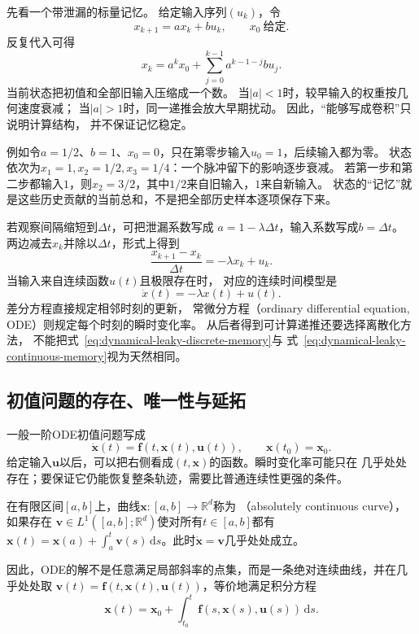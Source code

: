 先看一个带泄漏的标量记忆。 给定输入序列$(u_{k})$，令
\begin{equation}
	x_{k+1}=a x_{k}+b u_{k}, \qquad x_{0}\ \text{给定}. \label{eq:dynamical-leaky-discrete-memory}
\end{equation}
反复代入可得
\begin{equation}
	x_{k}= a^{k}x_{0}+ \sum_{j=0}^{k-1}a^{k-1-j}b u_{j}. \label{eq:dynamical-discrete-variation-constants}
\end{equation}
当前状态把初值和全部旧输入压缩成一个数。 当$|a|<1$时，较早输入的权重按几何速度衰减；
当$|a|>1$时，同一递推会放大早期扰动。 因此，“能够写成卷积”只说明计算结构，
并不保证记忆稳定。

例如令$a=1/2$、$b=1$、$x_0=0$，只在第零步输入$u_0=1$，后续输入都为零。
状态依次为$x_1=1,x_2=1/2,x_3=1/4$：一个脉冲留下的影响逐步衰减。
若第一步和第二步都输入$1$，则$x_2=3/2$，其中$1/2$来自旧输入，$1$来自新输入。
状态的“记忆”就是这些历史贡献的当前总和，不是把全部历史样本逐项保存下来。


若观察间隔缩短到$\Delta t$，可把泄漏系数写成 $a=1-\lambda\Delta t$，输入系数写成$b
=\Delta t$。 两边减去$x_{k}$并除以$\Delta t$，形式上得到
\[
	\frac{x_{k+1}-x_{k}}{\Delta t}= -\lambda x_{k}+u_{k}.
\]
当输入来自连续函数$u(t)$且极限存在时， 对应的连续时间模型是
\begin{equation}
	\dot{x}(t)=-\lambda x(t)+u(t). \label{eq:dynamical-leaky-continuous-memory}
\end{equation}
差分方程直接规定相邻时刻的更新， 常微分方程（ordinary differential equation, ODE）则规定每个时刻的瞬时变化率。
从后者得到可计算递推还要选择离散化方法， 不能把式~\eqref{eq:dynamical-leaky-discrete-memory}与
式~\eqref{eq:dynamical-leaky-continuous-memory}视为天然相同。

\subsection{初值问题的存在、唯一性与延拓}

一般一阶ODE初值问题写成
\begin{equation}
	\dot{\bm{x}}(t) = \bm{f}(t,\bm{x}(t),\bm{u}(t)), \qquad
	\bm{x}(t_{0})=\bm{x}_{0}. \label{eq:dynamical-general-ivp}
\end{equation}
给定输入$\bm{u}$以后，可以把右侧看成$(t,\bm{x})$的函数。瞬时变化率可能只在
几乎处处存在；要保证它仍能恢复整条轨迹，需要比普通连续性更强的条件。
\begin{definition}[绝对连续曲线]
\label{def:dynamical-absolutely-continuous-curve}
在有限区间$[a,b]$上，曲线$\bm x:[a,b]\to\mathbb R^d$称为
（absolutely continuous curve），如果存在
$\bm v\in L^1([a,b];\mathbb R^d)$使对所有$t\in[a,b]$都有
\(\bm{x}(t)=\bm{x}(a)+\int_a^t\bm{v}(s)\,\mathrm{d}s\)。此时$\dot{\bm x}=\bm v$几乎处处成立。
\end{definition}
因此，ODE的解不是任意满足局部斜率的点集，而是一条绝对连续曲线，并在几乎处处取
\(\bm{v}(t)=\bm{f}(t,\bm{x}(t),\bm{u}(t))\)，等价地满足积分方程
\begin{equation}
	\bm{x}(t) = \bm{x}_{0}+ \int_{t_0}^{t}\bm{f}(s,\bm{x}(s),\bm{u}(s))\,\mathrm{d}
	s. \label{eq:dynamical-ivp-integral-form}
\end{equation}

